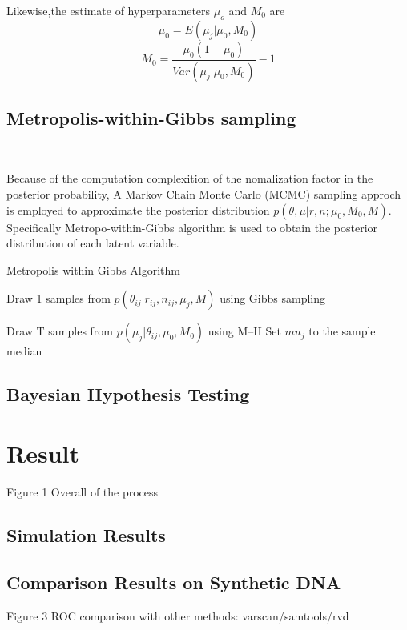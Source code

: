\documentclass[11pt,reqno]{amsart}
\begin{document}
Likewise,the estimate of hyperparameters $\mu_o$ and $M_0$ are
\begin{equation}
 \mu_0=E(\mu_j|\mu_0,M_0)
\end{equation}
\begin{equation}
 M_0=\frac{\mu_0(1-\mu_0)}{Var(\mu_j|\mu_0,M_0)}-1
\end{equation}

\subsection{Metropolis-within-Gibbs sampling}\

Because of the computation complexition of the nomalization factor in the posterior probability, A Markov Chain Monte Carlo (MCMC) sampling approch is employed to approximate the posterior distribution $p(\theta, \mu | r,n; \mu_0,M_0,M)$. Specifically Metropo-within-Gibbs algorithm is used to obtain the posterior distribution of each latent variable.

\begin{algorithm}[ht]
\caption{Metropolis within Gibbs Algorithm}
\label{alg:metro_gibbs}
\begin{algorithmic}[1]
\REPEAT
{}
	\STATE Draw 1 samples from $p \left( \theta_{ij} |r_{ij},n_{ij},\mu_j,M \right)$ using Gibbs sampling
  \ENDFOR
\ENDFOR

	\STATE Draw T samples from $p \left( \mu_j |\theta_{ij},\mu_0,M_0\right)$ using M--H
	\STATE Set $mu_j$ to the sample median
\ENDFOR
{}

\end{algorithmic}
\end{algorithm}


\subsection{Bayesian Hypothesis Testing}

\section{Result}
Figure 1 Overall of the process
\subsection{Simulation Results}
\subsection{Comparison Results on Synthetic DNA}
Figure 3 ROC comparison with other methods: varscan/samtools/rvd
\end{document}
